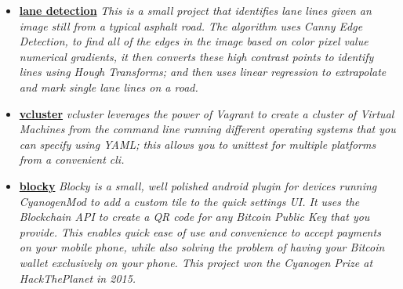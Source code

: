 \documentclass[12pt,a4paper,sans]{moderncv}
\begin{document}
\begin{itemize}


\item{\textbf{\href{https://github.com/davidawad/lane-detection}{lane detection}}\textit{ This is a small project that identifies lane lines given an image still from a typical asphalt road. The algorithm uses Canny Edge Detection, to find all of the edges in the image based on color pixel value numerical gradients, it then converts these high contrast points to identify lines using Hough Transforms; and then uses linear regression to extrapolate and mark single lane lines on a road.}}

\item{\textbf{\href{https://github.com/davidawad/vcluster}{vcluster}}\textit{ vcluster leverages the power of Vagrant to create a cluster of Virtual Machines from the command line running different operating systems that you can specify using YAML; this allows you to unittest for multiple platforms from a convenient cli.}}
\vspace{5pt}

\iffalse 
  \item{\textbf{\href{http://github.com/davidawad/Quantum-Simulator}{Quantum Simulator}} \textit{ I currently maintain a quantum computation simulator written in python to replicate the effects of quantum logical gates on quantum bits in order to asses changes in amplitudes and experiment on quantum algorithms.}}
  \vspace{5pt}

  \item{\textbf{\href{http://insightweets.mybluemix.net/landing}{Insightweets}}\textit{ Insightweets is an app meant to gather insights about specific kinds of people in any geographic location using Twitter and machine learning. It queries Twitter for location based data and then processes it using machine learning. Built using NodeJS, Express, Jade, LESS, and the Twitter API. This project won the IBM Bluemix prize at HackNY in 2015.}}
  \vspace{5pt}
\fi

\item{\textbf{\href{http://github.com/davidawad/blocky}{blocky}} \textit{ 
Blocky is a small, well polished android plugin for devices running CyanogenMod to add a custom tile to the quick settings UI. It uses the Blockchain API to create a QR code for any Bitcoin Public Key that you provide. This enables quick ease of use and convenience to accept payments on your mobile phone, while also solving the problem of having your Bitcoin wallet exclusively on your phone. This project won the Cyanogen Prize at HackThePlanet in 2015.
}}


\end{itemize}
\end{document}
